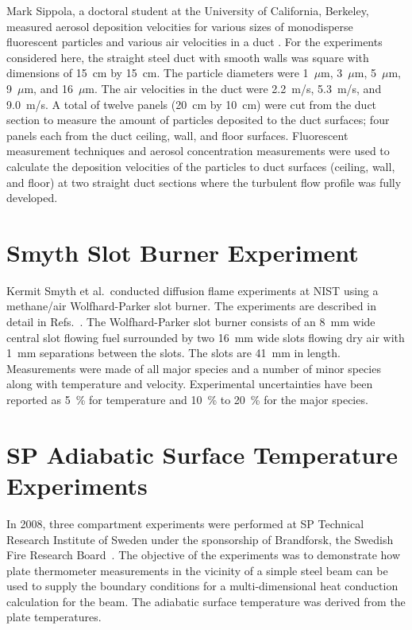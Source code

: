 Mark Sippola, a doctoral student at the University of California, Berkeley, measured aerosol deposition velocities for various sizes of monodisperse fluorescent particles and various air velocities in a duct \cite{Sippola:2002,Sippola:2010}. For the experiments considered here, the straight steel duct with smooth walls was square with dimensions of 15~cm by 15~cm. The particle diameters were 1~$\mu$m, 3~$\mu$m, 5~$\mu$m, 9~$\mu$m, and 16~$\mu$m. The air velocities in the duct were 2.2~m/s, 5.3~m/s, and 9.0~m/s. A total of twelve panels (20~cm by 10~cm) were cut from the duct section to measure the amount of particles deposited to the duct surfaces; four panels each from the duct ceiling, wall, and floor surfaces. Fluorescent measurement techniques and aerosol concentration measurements were used to calculate the deposition velocities of the particles to duct surfaces (ceiling, wall, and floor) at two straight duct sections where the turbulent flow profile was fully developed.

\section{Smyth Slot Burner Experiment}

Kermit Smyth et al.~conducted diffusion flame experiments at NIST using a methane/air Wolfhard-Parker slot burner. The experiments are described in detail in Refs.~\cite{Norton:1,Smyth:1}. The Wolfhard-Parker slot burner consists of an 8~mm wide central slot flowing fuel surrounded by two 16~mm wide slots flowing dry air with 1~mm separations between the slots.
The slots are 41~mm in length. Measurements were made of all major species and a number of minor species along with temperature and velocity. Experimental uncertainties have been reported as 5~\% for temperature  and 10~\% to 20~\%
for the major species.

\section{SP Adiabatic Surface Temperature Experiments}

In 2008, three compartment experiments were performed at SP Technical Research Institute of Sweden under the sponsorship of Brandforsk, the Swedish Fire Research Board~\cite{Wickstrom_AST}. The objective of the experiments was to demonstrate how plate thermometer measurements in the vicinity of a simple steel beam can be used to supply the boundary conditions for a multi-dimensional heat conduction calculation for the beam. The adiabatic surface temperature was derived from the plate temperatures.

